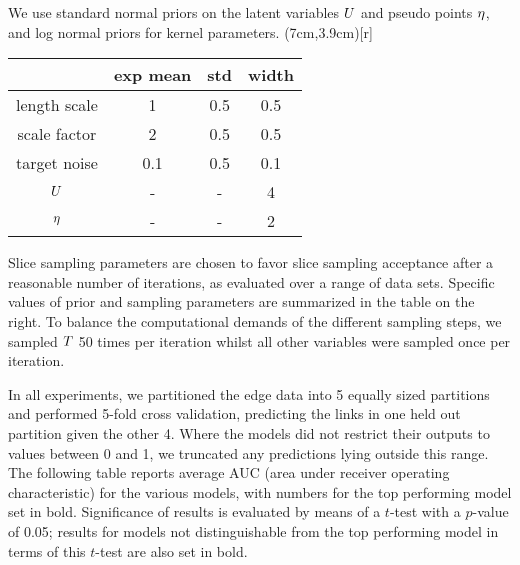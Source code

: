 We use standard normal priors on the latent variables $U$ and pseudo points $\eta$, and log normal priors for kernel parameters.
\vspace{-0.18cm}
\parpic(7cm,3.9cm)[r]{
\begin{minipage}[h]{8cm}
\begin{center}
  \begin{tabular}{c | c c c}
    {} & exp mean & std & width \\
    \midrule
    length scale & 1 & 0.5 & 0.5 \\
    scale factor & 2 & 0.5 & 0.5 \\
    target noise & 0.1 & 0.5 & 0.1 \\
    $U$ & - & - & 4 \\
    $\eta$ & - & - & 2
  \end{tabular}
\end{center}
\end{minipage}}
Slice sampling parameters are chosen to favor slice sampling acceptance after a reasonable number of iterations, as evaluated over a range of data sets.
Specific values of prior and sampling parameters are summarized in the table on the right.
To balance the computational demands of the different sampling steps, we sampled $T$ 50 times per iteration whilst all other variables were sampled once per iteration.

In all experiments, we partitioned the edge data into 5 equally sized partitions and performed 5-fold cross validation, predicting the links in one held out partition given the other 4. 
Where the models did not restrict their outputs to values between 0 and 1, we truncated any predictions lying outside this range.
The following table reports average AUC (area under receiver operating characteristic) for the various models, with numbers for the top performing model set in bold.
Significance of results is evaluated by means of a $t$-test with a $p$-value of 0.05; results for models not distinguishable from the top performing model in terms of this $t$-test are also set in bold.

